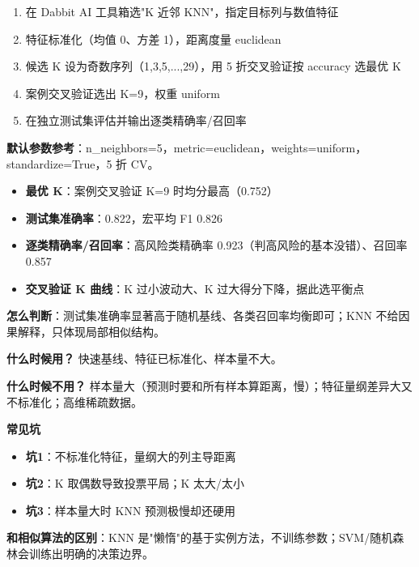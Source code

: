 \begin{algosposs}
\begin{enumerate}
    \item 在 Dabbit AI 工具箱选"K 近邻 KNN"，指定目标列与数值特征
    \item 特征标准化（均值 0、方差 1），距离度量 euclidean
    \item 候选 K 设为奇数序列（1,3,5,...,29），用 5 折交叉验证按 accuracy 选最优 K
    \item 案例交叉验证选出 K=9，权重 uniform
    \item 在独立测试集评估并输出逐类精确率/召回率
\end{enumerate}

\textbf{默认参数参考}：n\_neighbors=5，metric=euclidean，weights=uniform，standardize=True，5 折 CV。
\end{algosposs}

\begin{algoresult}
\begin{itemize}
    \item \textbf{最优 K}：案例交叉验证 K=9 时均分最高（0.752）
    \item \textbf{测试集准确率}：0.822，宏平均 F1 0.826
    \item \textbf{逐类精确率/召回率}：高风险类精确率 0.923（判高风险的基本没错）、召回率 0.857
    \item \textbf{交叉验证 K 曲线}：K 过小波动大、K 过大得分下降，据此选平衡点
\end{itemize}

\textbf{怎么判断}：测试集准确率显著高于随机基线、各类召回率均衡即可；KNN 不给因果解释，只体现局部相似结构。
\end{algoresult}

\begin{algonotes}
\textbf{什么时候用？} 快速基线、特征已标准化、样本量不大。

\textbf{什么时候不用？} 样本量大（预测时要和所有样本算距离，慢）；特征量纲差异大又不标准化；高维稀疏数据。

\textbf{常见坑}
\begin{itemize}
    \item \textbf{坑1}：不标准化特征，量纲大的列主导距离
    \item \textbf{坑2}：K 取偶数导致投票平局；K 太大/太小
    \item \textbf{坑3}：样本量大时 KNN 预测极慢却还硬用
\end{itemize}

\textbf{和相似算法的区别}：KNN 是"懒惰"的基于实例方法，不训练参数；SVM/随机森林会训练出明确的决策边界。
\end{algonotes}

